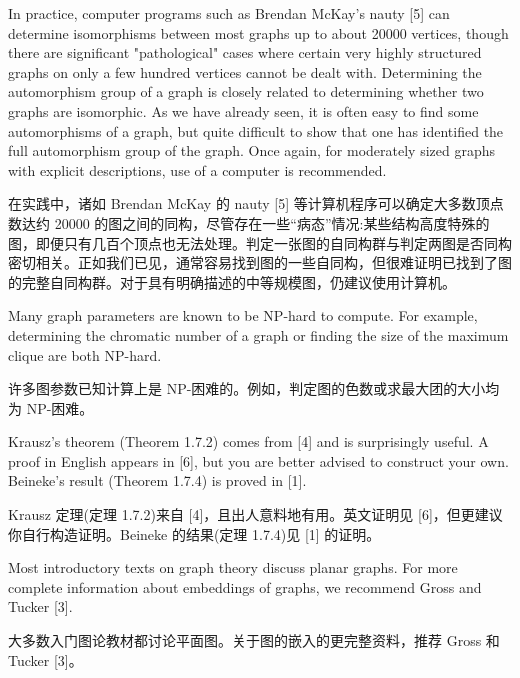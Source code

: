 \documentclass[10pt]{article}
\begin{document}
In practice, computer programs such as Brendan McKay's nauty [5] can determine isomorphisms between most graphs up to about 20000 vertices, though there are significant "pathological" cases where certain very highly structured graphs on only a few hundred vertices cannot be dealt with. Determining the automorphism group of a graph is closely related to determining whether two graphs are isomorphic. As we have already seen, it is often easy to find some automorphisms of a graph, but quite difficult to show that one has identified the full automorphism group of the graph. Once again, for moderately sized graphs with explicit descriptions, use of a computer is recommended.

\begin{tcolorbox}\relax
在实践中，诸如 Brendan McKay 的 nauty [5] 等计算机程序可以确定大多数顶点数达约 20000 的图之间的同构，尽管存在一些“病态”情况:某些结构高度特殊的图，即便只有几百个顶点也无法处理。判定一张图的自同构群与判定两图是否同构密切相关。正如我们已见，通常容易找到图的一些自同构，但很难证明已找到了图的完整自同构群。对于具有明确描述的中等规模图，仍建议使用计算机。
\end{tcolorbox}

Many graph parameters are known to be NP-hard to compute. For example, determining the chromatic number of a graph or finding the size of the maximum clique are both NP-hard.

\begin{tcolorbox}\relax
许多图参数已知计算上是 NP-困难的。例如，判定图的色数或求最大团的大小均为 NP-困难。
\end{tcolorbox}

Krausz's theorem (Theorem 1.7.2) comes from [4] and is surprisingly useful. A proof in English appears in [6], but you are better advised to construct your own. Beineke's result (Theorem 1.7.4) is proved in [1].

\begin{tcolorbox}\relax
Krausz 定理(定理 1.7.2)来自 [4]，且出人意料地有用。英文证明见 [6]，但更建议你自行构造证明。Beineke 的结果(定理 1.7.4)见 [1] 的证明。
\end{tcolorbox}

Most introductory texts on graph theory discuss planar graphs. For more complete information about embeddings of graphs, we recommend Gross and Tucker [3].

\begin{tcolorbox}\relax
大多数入门图论教材都讨论平面图。关于图的嵌入的更完整资料，推荐 Gross 和 Tucker [3]。
\end{tcolorbox}
\end{document}
